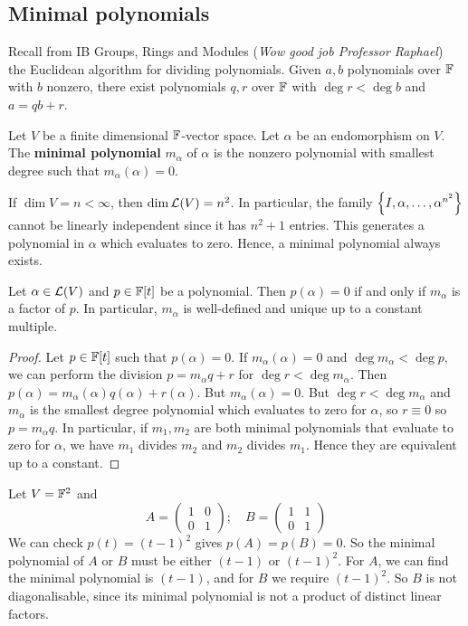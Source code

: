 \documentclass[a4paper,11pt]{article}
\begin{document}
\subsection{Minimal polynomials}
{\color{blue}Recall from IB Groups, Rings and Modules} (\textit{Wow good job Professor Raphael}) the Euclidean algorithm for dividing polynomials.
Given $ a, b $ polynomials over $ {\mathbb{F}} $ with $ b $ nonzero, there exist polynomials $ q, r $ over $ {\mathbb{F}} $ with $ \deg r < \deg b $ and $ a = qb + r $.
\begin{definition}
	Let $ V $ be a finite dimensional $ {\mathbb{F}} $-vector space.
	Let $ \alpha $ be an endomorphism on $ V $.
	The \textbf{minimal polynomial} $ m_\alpha $ of $ \alpha $ is the nonzero polynomial with smallest degree such that $ m_\alpha(\alpha) = 0 $.
\end{definition}
\begin{remark}
	If $ \dim V = n < \infty $, then $ \dim {\mathcal{L}}(V) = n^2 $.
	In particular, the family $ \qty{I, \alpha, \dots, \alpha^{n^2}} $ cannot be linearly independent since it has $ n^2+1 $ entries.
	This generates a polynomial in $ \alpha $ which evaluates to zero.
	Hence, a minimal polynomial always exists.
\end{remark}
\begin{lemma}
	Let $ \alpha \in {\mathcal{L}}(V) $ and $ p \in {\mathbb{F}}[t] $ be a polynomial.
	Then $ p(\alpha) = 0 $ if and only if $ m_\alpha $ is a factor of $ p $.
	In particular, $ m_\alpha $ is well-defined and unique up to a constant multiple.
\end{lemma}
\begin{proof}
	Let $ p \in {\mathbb{F}}[t] $ such that $ p(\alpha) = 0 $.
	If $ m_\alpha(\alpha) = 0 $ and $ \deg m_\alpha < \deg p $, we can perform the division $ p = m_\alpha q + r $ for $ \deg r < \deg m_\alpha $.
	Then $ p(\alpha) = m_\alpha(\alpha) q(\alpha) + r(\alpha) $.
	But $ m_\alpha(\alpha) = 0 $.
	But $ \deg r < \deg m_\alpha $ and $ m_\alpha $ is the smallest degree polynomial which evaluates to zero for $ \alpha $, so $ r \equiv 0 $ so $ p = m_\alpha q $.
	In particular, if $ m_1, m_2 $ are both minimal polynomials that evaluate to zero for $ \alpha $, we have $ m_1 $ divides $ m_2 $ and $ m_2 $ divides $ m_1 $.
	Hence they are equivalent up to a constant.
\end{proof}
\begin{example}
	Let $ V = {\mathbb{F}}^2 $ and
	\[
		A= \begin{pmatrix}
			1 & 0 \\
			0 & 1
		\end{pmatrix};\quad B = \begin{pmatrix}
			1 & 1 \\
			0 & 1
		\end{pmatrix}
	\]
	We can check $ p(t) = (t-1)^2 $ gives $ p(A) = p(B) = 0 $.
	So the minimal polynomial of $ A $ or $ B $ must be either $ (t-1) $ or $ (t-1)^2 $.
	For $ A $, we can find the minimal polynomial is $ (t-1) $, and for $ B $ we require $ (t-1)^2 $.
	So $ B $ is not diagonalisable, since its minimal polynomial is not a product of distinct linear factors.
\end{example}
\end{document}
